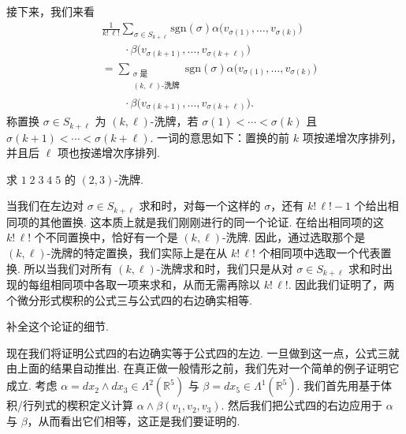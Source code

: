 接下来，我们来看
\[
\begin{aligned}
&\frac{1}{k!\,\ell!}\sum_{\sigma\in S_{k+\ell}}\mathrm{sgn}(\sigma)\alpha\bigl(v_{\sigma(1)},\ldots,v_{\sigma(k)}\bigr)\\
&\qquad\cdot\beta\bigl(v_{\sigma(k+1)},\ldots,v_{\sigma(k+\ell)}\bigr)\\
&=\sum_{\substack{\sigma\text{ 是}\\ (k,\ell)\text{-洗牌}}}\mathrm{sgn}(\sigma)\alpha\bigl(v_{\sigma(1)},\ldots,v_{\sigma(k)}\bigr)\\
&\qquad\cdot\beta\bigl(v_{\sigma(k+1)},\ldots,v_{\sigma(k+\ell)}\bigr).
\end{aligned}
\]
称置换 $\sigma\in S_{k+\ell}$ 为 $(k,\ell)$-洗牌，若 $\sigma(1)<\cdots<\sigma(k)$ 且 $\sigma(k+1)<\cdots<\sigma(k+\ell)$.  一词的意思如下：置换的前 $k$ 项按递增次序排列，并且后 $\ell$ 项也按递增次序排列.

\begin{question}\label{q:3-18}
求 $1\;2\;3\;4\;5$ 的 $(2,3)$-洗牌.
\end{question}

当我们在左边对 $\sigma\in S_{k+\ell}$ 求和时，对每一个这样的 $\sigma$，还有 $k!\,\ell!-1$ 个给出相同项的其他置换. 这本质上就是我们刚刚进行的同一个论证. 在给出相同项的这 $k!\,\ell!$ 个不同置换中，恰好有一个是 $(k,\ell)$-洗牌. 因此，通过选取那个是 $(k,\ell)$-洗牌的特定置换，我们实际上是在从 $k!\,\ell!$ 个相同项中选取一个代表置换. 所以当我们对所有 $(k,\ell)$-洗牌求和时，我们只是从对 $\sigma\in S_{k+\ell}$ 求和时出现的每组相同项中各取一项来求和，从而无需再除以 $k!\,\ell!$. 因此我们证明了，两个微分形式楔积的公式三与公式四的右边确实相等.

\begin{question}\label{q:3-19}
补全这个论证的细节.
\end{question}

现在我们将证明公式四的右边确实等于公式四的左边. 一旦做到这一点，公式三就由上面的结果自动推出. 在真正做一般情形之前，我们先对一个简单的例子证明它成立. 考虑 $\alpha=dx_2\wedge dx_3\in\Lambda^2(\mathbb{R}^5)$ 与 $\beta=dx_5\in\Lambda^1(\mathbb{R}^5)$. 我们首先用基于体积/行列式的楔积定义计算 $\alpha\wedge\beta(v_1,v_2,v_3)$. 然后我们把公式四的右边应用于 $\alpha$ 与 $\beta$，从而看出它们相等，这正是我们要证明的.

